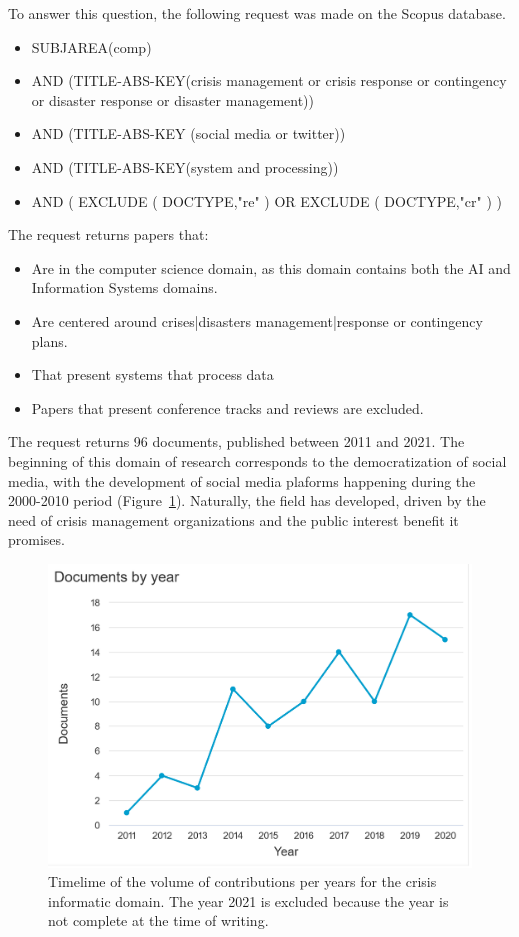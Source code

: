 To answer this question, the following request was made on the Scopus database.

\begin{itemize}
    \item SUBJAREA(comp)
    \item AND (TITLE-ABS-KEY({crisis management} or {crisis response} or contingency or {disaster response} or {disaster management}))
    \item AND (TITLE-ABS-KEY ({social media} or twitter))
    \item AND (TITLE-ABS-KEY(system and processing))
    \item AND ( EXCLUDE ( DOCTYPE,"re" ) OR EXCLUDE ( DOCTYPE,"cr" ) )
\end{itemize}

The request returns papers that:

\begin{itemize}
    \item Are in the computer science domain, as this domain contains both the AI and Information Systems domains.
    \item Are centered around crises|disasters management|response or contingency plans.
    \item That present systems that process data
    \item Papers that present conference tracks and reviews are excluded.
\end{itemize}

The request returns 96 documents, published between 2011 and 2021.
The beginning of this domain of research corresponds to the democratization of social media, with the development of social media plaforms happening during the 2000-2010 period (Figure~\ref{literature:crisis-informatic-hist}).
Naturally, the field has developed, driven by the need of crisis management organizations and the public interest benefit it promises.

\begin{figure}[htb]
    \includegraphics[width=\textwidth]{figures/chap-2/crisis-informatic-hist.pdf}
    \caption{Timelime of the volume of contributions per years for the crisis informatic domain. The year 2021 is excluded because the year is not complete at the time of writing.}
    \label{literature:crisis-informatic-hist}
\end{figure}

